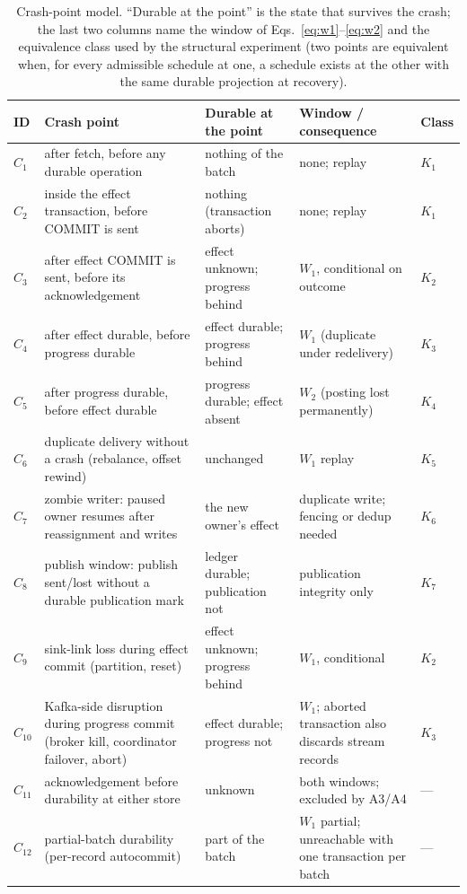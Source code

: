 \begin{table}[t]
\centering
\scriptsize
\caption{Crash-point model. ``Durable at the point'' is the state that survives the crash; the
last two columns name the window of Eqs.~\eqref{eq:w1}--\eqref{eq:w2} and the equivalence class
used by the structural experiment (two points are equivalent when, for every admissible schedule
at one, a schedule exists at the other with the same durable projection at recovery).}
\label{tab:crashpoints}
\begin{tabular}{@{}p{0.55cm}p{6.6cm}p{3.3cm}p{3.3cm}p{1.5cm}@{}}
\toprule
ID & Crash point & Durable at the point & Window / consequence & Class \\
\midrule
$C_1$ & after fetch, before any durable operation & nothing of the batch & none; replay & $K_1$ \\
$C_2$ & inside the effect transaction, before COMMIT is sent & nothing (transaction aborts) & none; replay & $K_1$ \\
$C_3$ & after effect COMMIT is sent, before its acknowledgement & effect unknown; progress behind & $W_1$, conditional on outcome & $K_2$ \\
$C_4$ & after effect durable, before progress durable & effect durable; progress behind & $W_1$ (duplicate under redelivery) & $K_3$ \\
$C_5$ & after progress durable, before effect durable & progress durable; effect absent & $W_2$ (posting lost permanently) & $K_4$ \\
$C_6$ & duplicate delivery without a crash (rebalance, offset rewind) & unchanged & $W_1$ replay & $K_5$ \\
$C_7$ & zombie writer: paused owner resumes after reassignment and writes & the new owner's effect & duplicate write; fencing or dedup needed & $K_6$ \\
$C_8$ & publish window: publish sent/lost without a durable publication mark & ledger durable; publication not & publication integrity only & $K_7$ \\
$C_9$ & sink-link loss during effect commit (partition, reset) & effect unknown; progress behind & $W_1$, conditional & $K_2$ \\
$C_{10}$ & Kafka-side disruption during progress commit (broker kill, coordinator failover, abort) & effect durable; progress not & $W_1$; aborted transaction also discards stream records & $K_3$ \\
$C_{11}$ & acknowledgement before durability at either store & unknown & both windows; excluded by A3/A4 & --- \\
$C_{12}$ & partial-batch durability (per-record autocommit) & part of the batch & $W_1$ partial; unreachable with one transaction per batch & --- \\
\bottomrule
\end{tabular}
\end{table}
